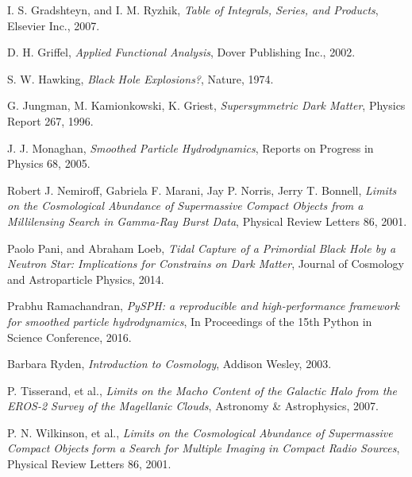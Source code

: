 \documentclass{jthesis}
\begin{document}
\begin{thebibliography}{99}
I. S. Gradshteyn, and I. M. Ryzhik, \emph{Table of Integrals, Series, and Products}, Elsevier Inc., 2007.

D. H. Griffel, \emph{Applied Functional Analysis}, Dover Publishing Inc., 2002.

S. W. Hawking, \emph{Black Hole Explosions?}, Nature, 1974.

G. Jungman, M. Kamionkowski, K. Griest, \emph{Supersymmetric Dark Matter}, Physics Report 267, 1996.

J. J. Monaghan, \emph{Smoothed Particle Hydrodynamics}, Reports on Progress in Physics 68, 2005.

Robert J. Nemiroff, Gabriela F. Marani, Jay P. Norris, Jerry T. Bonnell, \emph{Limits on the Cosmological Abundance of Supermassive Compact Objects from a Millilensing Search in Gamma-Ray Burst Data}, Physical Review Letters 86, 2001.

Paolo Pani, and Abraham Loeb, \emph{Tidal Capture of a Primordial Black Hole by a Neutron Star: Implications for Constrains on Dark Matter}, Journal of Cosmology and Astroparticle Physics, 2014.

Prabhu Ramachandran, \emph{PySPH: a reproducible and high-performance framework for smoothed particle hydrodynamics}, In Proceedings of the 15th Python in Science Conference, 2016.

Barbara Ryden, \emph{Introduction to Cosmology}, Addison Wesley, 2003.

P. Tisserand, et al., \emph{Limits on the Macho Content of the Galactic Halo from the EROS-2 Survey of the Magellanic Clouds}, Astronomy \& Astrophysics, 2007.

P. N. Wilkinson, et al., \emph{Limits on the Cosmological Abundance of Supermassive Compact Objects form a Search for Multiple Imaging in Compact Radio Sources}, Physical Review Letters 86, 2001.

\end{thebibliography}

%
%
\end{document}

